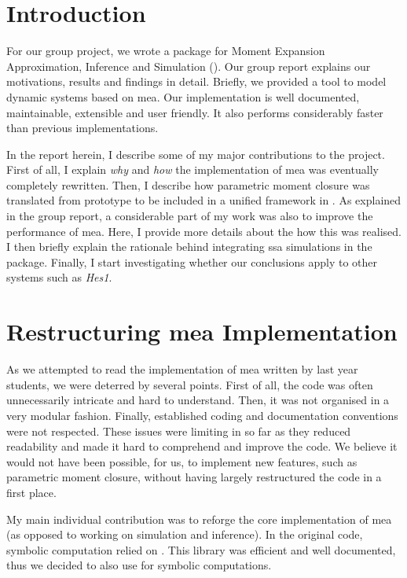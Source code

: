 
\section{Introduction}

For our group project, we wrote a \py{} package for Moment Expansion Approximation, Inference and Simulation (\means).
Our group report explains our motivations, results and findings in detail.
Briefly, we provided a tool to model dynamic systems based on \acrlong{mea}\cite{ale_general_2013}.
Our implementation is well documented, maintainable, extensible and user friendly.
It also performs considerably faster than previous implementations.

In the report herein, I describe some of my major contributions to the project.
First of all, I explain \emph{why} and \emph{how} the implementation of \acrlong{mea} was eventually completely rewritten.
Then, I describe how parametric moment closure was translated from \mat{} prototype to be included in a unified framework in \means.
As explained in the group report, a considerable part of my work was also to improve the performance of \gls{mea}.
Here, I provide more details about the how this was realised.  
I then briefly explain the rationale behind integrating \acrlong{ssa} simulations in the package.
Finally, I start investigating whether our conclusions apply to other systems such as \emph{Hes1}.

\section{Restructuring \acrlong{mea} Implementation}
As we attempted to read the \py{} implementation of \acrshort{mea} written by last year students\cite{babtie_moment_2013},
we were deterred by several points.
First of all, the code was often unnecessarily intricate and hard to understand.
Then, it was not organised in a very modular fashion.
Finally, established \py{} coding and documentation conventions\cite{_pep_????} were not respected.
These issues were limiting in so far as they reduced readability and made it hard to comprehend and improve the code.
We believe it would not have been possible, for us, to implement new features, such as parametric moment closure,
without having largely restructured the code in a first place.

My main individual contribution was to reforge the core implementation of \acrshort{mea} (as opposed to working on simulation and inference).
In the original code, symbolic computation relied on \sympy{}\cite{sympy_development_team_sympy:_2014}.
This library was efficient and well documented, thus we decided to also use \sympy{} for symbolic computations.
 
